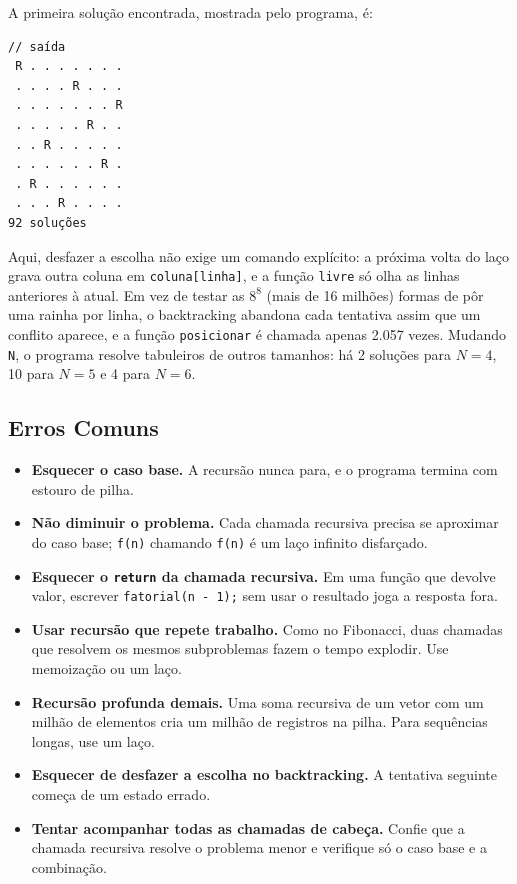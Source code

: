 A primeira solução encontrada, mostrada pelo programa, é:

\begin{codigo}
\begin{Verbatim}[breaklines=true, breaksymbolleft={}, fontsize=\footnotesize]
// saída
 R . . . . . . .
 . . . . R . . .
 . . . . . . . R
 . . . . . R . .
 . . R . . . . .
 . . . . . . R .
 . R . . . . . .
 . . . R . . . .
92 soluções
\end{Verbatim}
\end{codigo}

Aqui, desfazer a escolha não exige um comando explícito: a próxima volta do laço grava outra coluna em \texttt{coluna[linha]}, e a função \texttt{livre} só olha as linhas anteriores à atual. Em vez de testar as $8^8$ (mais de 16 milhões) formas de pôr uma rainha por linha, o backtracking abandona cada tentativa assim que um conflito aparece, e a função \texttt{posicionar} é chamada apenas 2.057 vezes. Mudando \texttt{N}, o programa resolve tabuleiros de outros tamanhos: há 2 soluções para $N = 4$, 10 para $N = 5$ e 4 para $N = 6$.

\subsection{Erros Comuns}

\begin{itemize}
  \item \textbf{Esquecer o caso base.} A recursão nunca para, e o programa termina com estouro de pilha.
  \item \textbf{Não diminuir o problema.} Cada chamada recursiva precisa se aproximar do caso base; \texttt{f(n)} chamando \texttt{f(n)} é um laço infinito disfarçado.
  \item \textbf{Esquecer o \texttt{return} da chamada recursiva.} Em uma função que devolve valor, escrever \texttt{fatorial(n - 1);} sem usar o resultado joga a resposta fora.
  \item \textbf{Usar recursão que repete trabalho.} Como no Fibonacci, duas chamadas que resolvem os mesmos subproblemas fazem o tempo explodir. Use memoização ou um laço.
  \item \textbf{Recursão profunda demais.} Uma soma recursiva de um vetor com um milhão de elementos cria um milhão de registros na pilha. Para sequências longas, use um laço.
  \item \textbf{Esquecer de desfazer a escolha no backtracking.} A tentativa seguinte começa de um estado errado.
  \item \textbf{Tentar acompanhar todas as chamadas de cabeça.} Confie que a chamada recursiva resolve o problema menor e verifique só o caso base e a combinação.
\end{itemize}
